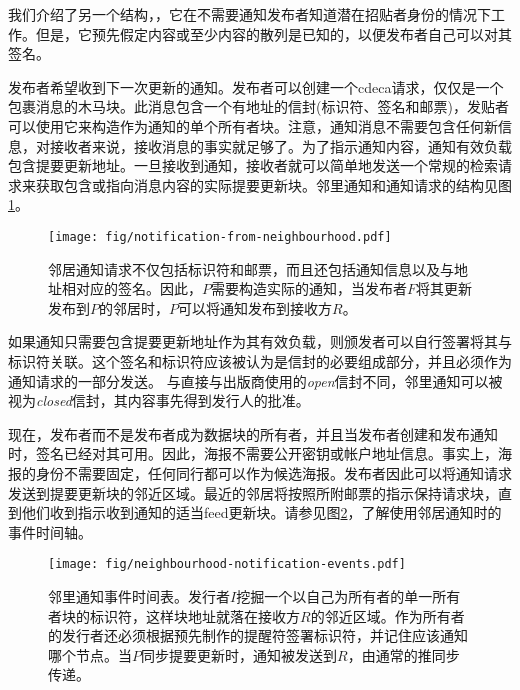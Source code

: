 我们介绍了另一个结构，，它在不需要通知发布者知道潜在招贴者身份的情况下工作。但是，它预先假定内容或至少内容的散列是已知的，以便发布者自己可以对其签名。


发布者希望收到下一次更新的通知。发布者可以创建一个cdeca请求，仅仅是一个包裹消息的木马块。此消息包含一个有地址的信封(标识符、签名和邮票)，发贴者可以使用它来构造作为通知的单个所有者块。注意，通知消息不需要包含任何新信息，对接收者来说，接收消息的事实就足够了。为了指示通知内容，通知有效负载包含提要更新地址。一旦接收到通知，接收者就可以简单地发送一个常规的检索请求来获取包含或指向消息内容的实际提要更新块。邻里通知和通知请求的结构见图\ref{fig:notification-from-neighbourhood}。
                                

\begin{figure}[htbp]
\centering
\texttt{[image: fig/notification-from-neighbourhood.pdf]}
\caption[社区通知\statusgreen]{邻居通知请求不仅包括标识符和邮票，而且还包括通知信息以及与地址相对应的签名。因此，$P$需要构造实际的通知，当发布者$F$将其更新发布到$P$的邻居时，$P$可以将通知发布到接收方$R$。}
\label{fig:notification-from-neighbourhood}
\end{figure}

如果通知只需要包含提要更新地址作为其有效负载，则颁发者可以自行签署将其与标识符关联。这个签名和标识符应该被认为是信封的必要组成部分，并且必须作为通知请求的一部分发送。
与直接与出版商使用的\emph{open}信封不同，邻里通知可以被视为\emph{closed}信封，其内容事先得到发行人的批准。 

现在，发布者而不是发布者成为数据块的所有者，并且当发布者创建和发布通知时，签名已经对其可用。因此，海报不需要公开密钥或帐户地址信息。事实上，海报的身份不需要固定，任何同行都可以作为候选海报。发布者因此可以将通知请求发送到提要更新块的邻近区域。最近的邻居将按照所附邮票的指示保持请求块，直到他们收到指示收到通知的适当feed更新块。请参见图\ref{fig:neighbourhood-notification-events}，了解使用邻居通知时的事件时间轴。

\begin{figure}[htbp]
\centering
\texttt{[image: fig/neighbourhood-notification-events.pdf]}
\caption[事件的邻里通知时间表\statusgreen]{邻里通知事件时间表。发行者$I$挖掘一个以自己为所有者的单一所有者块的标识符，这样块地址就落在接收方$R$的邻近区域。作为所有者的发行者还必须根据预先制作的提醒符签署标识符，并记住应该通知哪个节点。当$P$同步提要更新时，通知被发送到$R$，由通常的推同步传递。}
\label{fig:neighbourhood-notification-events}
\end{figure}
  

